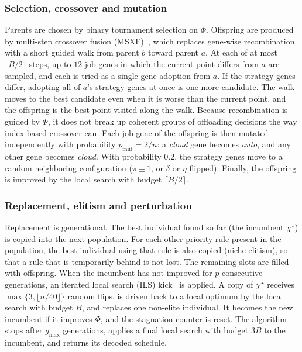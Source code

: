 \documentclass[conference]{IEEEtran}
\begin{document}
\subsubsection{Selection, crossover and mutation}
Parents are chosen by binary tournament selection on $\Phi$. Offspring are produced by multi-step crossover fusion (MSXF)~\cite{Yamada1996}, which replaces gene-wise recombination with a short guided walk from parent $b$ toward parent $a$. At each of at most $\lceil B/2\rceil$ steps, up to $12$ job genes in which the current point differs from $a$ are sampled, and each is tried as a single-gene adoption from $a$. If the strategy genes differ, adopting all of $a$'s strategy genes at once is one more candidate. The walk moves to the best candidate even when it is worse than the current point, and the offspring is the best point visited along the walk. Because recombination is guided by $\Phi$, it does not break up coherent groups of offloading decisions the way index-based crossover can. Each job gene of the offspring is then mutated independently with probability $p_{\mathrm{mut}}=2/n$: a \emph{cloud} gene becomes \emph{auto}, and any other gene becomes \emph{cloud}. With probability $0.2$, the strategy genes move to a random neighboring configuration ($\pi\pm1$, or $\delta$ or $\eta$ flipped). Finally, the offspring is improved by the local search with budget $\lceil B/2\rceil$.

\subsubsection{Replacement, elitism and perturbation}
Replacement is generational. The best individual found so far (the incumbent $\chi^\star$) is copied into the next population. For each other priority rule present in the population, the best individual using that rule is also copied (niche elitism), so that a rule that is temporarily behind is not lost. The remaining slots are filled with offspring. When the incumbent has not improved for $p$ consecutive generations, an iterated local search (ILS) kick~\cite{Lourenco2003} is applied. A copy of $\chi^\star$ receives $\max\{3,\lfloor n/40\rfloor\}$ random flips, is driven back to a local optimum by the local search with budget $B$, and replaces one non-elite individual. It becomes the new incumbent if it improves $\Phi$, and the stagnation counter is reset. The algorithm stops after $g_{\max}$ generations, applies a final local search with budget $3B$ to the incumbent, and returns its decoded schedule.
\end{document}
